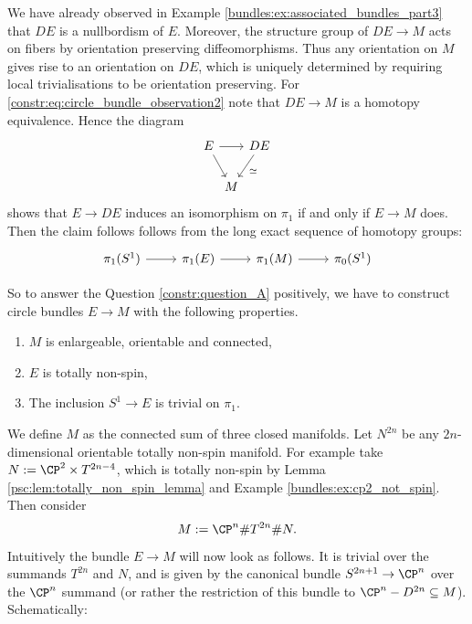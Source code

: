 We have already observed in Example \ref{bundles:ex:associated_bundles_part3} that $DE$ is a nullbordism of $E$. Moreover, the structure group of $DE \to M$ acts on fibers by orientation preserving diffeomorphisms. Thus any orientation on $M$ gives rise to an orientation on $DE$, which is uniquely determined by requiring local trivialisations to be orientation preserving. For \ref{constr:eq:circle_bundle_observation2} note that $DE \to M$ is a homotopy equivalence. Hence the diagram 
\[\begin{tikzcd}[column sep=0cm]
	E && DE \\
	& M
	\arrow[from=1-1, to=1-3]
	\arrow[from=1-1, to=2-2]
	\arrow["\simeq", from=1-3, to=2-2]
\end{tikzcd}\]
shows that $E \to DE$ induces an isomorphism on $\pi_1$ if and only if $E \to M$ does. Then the claim follows follows from the long exact sequence of homotopy groups:
\[\begin{tikzcd}
	{\pi_1(S^1)} & {\pi_1(E)} & {\pi_1(M)} & {\pi_0(S^1)}
	\arrow[from=1-1, to=1-2]
	\arrow[from=1-2, to=1-3]
	\arrow[from=1-3, to=1-4]
\end{tikzcd}\]

So to answer the Question \ref{constr:question_A} positively, we have to construct circle bundles $E \to M$ with the following properties.

\begin{enumerate}[label = (\Roman*)]
	\item \label{constr:property1} $M$ is enlargeable, orientable and connected,
	\item \label{constr:property2} $E$ is totally non-spin,
	\item \label{constr:property3} The inclusion $S^1 \to E$ is trivial on $\pi_1$.
\end{enumerate}

We define $M$ as the connected sum of three closed manifolds. Let $N^{2n}$ be any $2n$-dimensional orientable totally non-spin manifold. For example take $N:= \CP^2 \times T^{2n-4}$, which is totally non-spin by Lemma \ref{psc:lem:totally_non_spin_lemma} and Example \ref{bundles:ex:cp2_not_spin}. Then consider
\[
M := \CP^n \# T^{2n} \# N.
\] 
Intuitively the bundle $E \to M$ will now look as follows. It is trivial over the summands $T^{2n}$ and $N$, and is given by the canonical bundle $S^{2n+1} \to \CP^n$ over the $\CP^n$ summand (or rather the restriction of this bundle to $\CP^n - D^{2n} \subseteq M$). Schematically:

\placeholder

